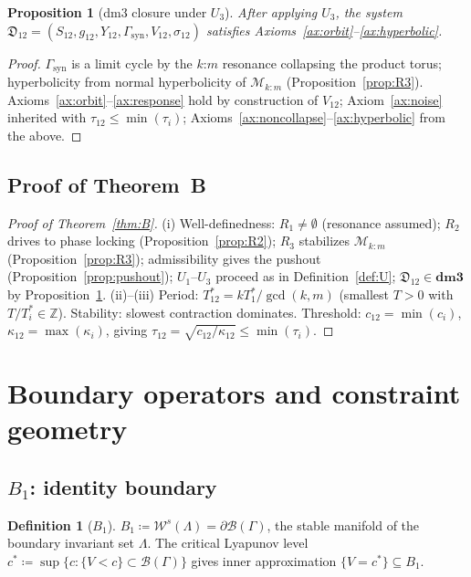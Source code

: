 \documentclass[12pt, oneside]{book}
\theoremstyle{plain}
\newtheorem{proposition}[theorem]{Proposition}
\theoremstyle{definition}
\newtheorem{definition}{Definition}[section]
\theoremstyle{remark}
\newcommand{\dm}{\mathfrak{D}}
\newcommand{\dmcat}{\mathbf{dm3}}
\newcommand{\Orb}{\Gamma}
\newcommand{\cB}{\mathcal{B}}
\newcommand{\cM}{\mathcal{M}}
\begin{document}
\begin{proposition}[dm3 closure under $U_3$]\label{prop:closure}
After applying $U_3$, the system
$\dm_{12}=(S_{12},g_{12},Y_{12},\Orb_{\mathrm{syn}},V_{12},\sigma_{12})$
satisfies Axioms~\ref{ax:orbit}--\ref{ax:hyperbolic}.
\end{proposition}
\begin{proof}
$\Orb_{\mathrm{syn}}$ is a limit cycle by the $k$:$m$ resonance
collapsing the product torus; hyperbolicity from normal hyperbolicity
of $\cM_{k:m}$ (Proposition~\ref{prop:R3}). Axioms~\ref{ax:orbit}--\ref{ax:response}
hold by construction of $V_{12}$; Axiom~\ref{ax:noise} inherited
with $\tau_{12}\le\min(\tau_i)$; Axioms~\ref{ax:noncollapse}--\ref{ax:hyperbolic}
from the above.
\end{proof}

\subsection{Proof of Theorem~B}

\begin{proof}[Proof of Theorem~\ref{thm:B}]
(i) Well-definedness: $R_1\ne\emptyset$ (resonance assumed);
$R_2$ drives to phase locking (Proposition~\ref{prop:R2});
$R_3$ stabilizes $\cM_{k:m}$ (Proposition~\ref{prop:R3});
admissibility gives the pushout (Proposition~\ref{prop:pushout});
$U_1$--$U_3$ proceed as in Definition~\ref{def:U};
$\dm_{12}\in\dmcat$ by Proposition~\ref{prop:closure}.
(ii)--(iii) Period: $T_{12}^*=kT_1^*/\gcd(k,m)$ (smallest $T>0$
with $T/T_i^*\in\mathbb{Z}$). Stability: slowest contraction dominates.
Threshold: $c_{12}=\min(c_i)$, $\kappa_{12}=\max(\kappa_i)$,
giving $\tau_{12}=\sqrt{c_{12}/\kappa_{12}}\le\min(\tau_i)$.
\end{proof}

\section{Boundary operators and constraint geometry}\label{sec:boundary}

\subsection{\texorpdfstring{$B_1$}{B1}: identity boundary}

\begin{definition}[$B_1$]\label{def:B1}
$B_1\coloneqq\mathcal{W}^s(\Lambda)=\partial\cB(\Orb)$,
the stable manifold of the boundary invariant set $\Lambda$.
The critical Lyapunov level
$c^*\coloneqq\sup\{c:\{V<c\}\subset\cB(\Orb)\}$
gives inner approximation $\{V=c^*\}\subseteq B_1$.
\end{definition}
\end{document}
